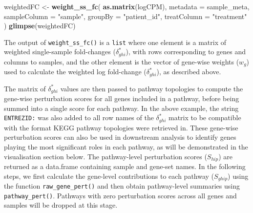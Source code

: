 \documentclass[9pt,a4paper,]{extarticle}
\newenvironment{Shaded}{\begin{snugshade}}{\end{snugshade}}
\newcommand{\AttributeTok}[1]{\textcolor[rgb]{0.13,0.29,0.53}{#1}}
\newcommand{\FunctionTok}[1]{\textcolor[rgb]{0.13,0.29,0.53}{\textbf{#1}}}
\newcommand{\NormalTok}[1]{#1}
\newcommand{\OtherTok}[1]{\textcolor[rgb]{0.56,0.35,0.01}{#1}}
\newcommand{\SpecialCharTok}[1]{\textcolor[rgb]{0.81,0.36,0.00}{\textbf{#1}}}
\newcommand{\StringTok}[1]{\textcolor[rgb]{0.31,0.60,0.02}{#1}}
\begin{document}
\begin{Shaded}
\begin{Highlighting}[]
\NormalTok{weightedFC }\OtherTok{\textless{}{-}} \FunctionTok{weight\_ss\_fc}\NormalTok{(}
  \FunctionTok{as.matrix}\NormalTok{(logCPM), }\AttributeTok{metadata =}\NormalTok{ sample\_meta,}
  \AttributeTok{sampleColumn =} \StringTok{"sample"}\NormalTok{, }\AttributeTok{groupBy =} \StringTok{"patient\_id"}\NormalTok{, }\AttributeTok{treatColumn =} \StringTok{"treatment"}
\NormalTok{)}
\FunctionTok{glimpse}\NormalTok{(weightedFC)}
\end{Highlighting}
\end{Shaded}

The output of \texttt{weight\_ss\_fc()} is a \texttt{list} where one element is a matrix of weighted single-sample fold-changes (\(\delta_{ghi}^*\)), with rows corresponding to genes and columns to samples, and the other element is the vector of gene-wise weights (\(w_g\)) used to calculate the weighted log fold-change (\(\delta_{ghi}^*\)), as described above.

The matrix of \(\delta_{ghi}^*\) values are then passed to pathway topologies to compute the gene-wise perturbation scores for all genes included in a pathway, before being summed into a single score for each pathway.
In the above example, the string \texttt{ENTREZID:} was also added to all row names of the \(\delta_{ghi}^*\) matrix to be compatible with the format KEGG pathway topologies were retrieved in.
These gene-wise perturbation scores can also be used in downstream analysis to identify genes playing the most significant roles in each pathway, as will be demonstrated in the visualisation section below.
The pathway-level perturbation scores (\(S_{hip}\)) are returned as a data.frame containing sample and gene-set names.
In the following steps, we first calculate the gene-level contributions to each pathway (\(S_{ghip}\)) using the function \texttt{raw\_gene\_pert()} and then obtain pathway-level summaries using \texttt{pathway\_pert()}.
Pathways with zero perturbation scores across all genes and samples will be dropped at this stage.

\begin{Shaded}
\end{Shaded}
\end{document}

